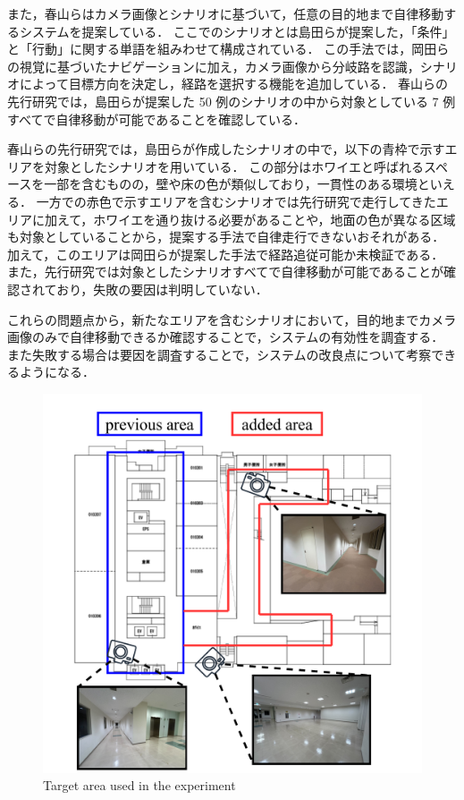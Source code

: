 また，春山らはカメラ画像とシナリオに基づいて，任意の目的地まで自律移動するシステムを提案している．
ここでのシナリオとは島田らが提案した，「条件」と「行動」に関する単語を組みわせて構成されている．
この手法では，岡田らの視覚に基づいたナビゲーションに加え，カメラ画像から分岐路を認識，シナリオによって目標方向を決定し，経路を選択する機能を追加している．
春山らの先行研究では，島田らが提案した 50 例のシナリオの中から対象としている 7 例すべてで自律移動が可能であることを確認している．

春山らの先行研究では，島田らが作成したシナリオの中で，以下の青枠で示すエリアを対象としたシナリオを用いている．
この部分はホワイエと呼ばれるスペースを一部を含むものの，壁や床の色が類似しており，一貫性のある環境といえる．
一方での赤色で示すエリアを含むシナリオでは先行研究で走行してきたエリアに加えて，ホワイエを通り抜ける必要があることや，地面の色が異なる区域も対象としていることから，提案する手法で自律走行できないおそれがある．
加えて，このエリアは岡田らが提案した手法で経路追従可能か未検証である．
また，先行研究では対象としたシナリオすべてで自律移動が可能であることが確認されており，失敗の要因は判明していない．

これらの問題点から，新たなエリアを含むシナリオにおいて，目的地までカメラ画像のみで自律移動できるか確認することで，システムの有効性を調査する．
また失敗する場合は要因を調査することで，システムの改良点について考察できるようになる．

\begin{figure}[htbp]
     \centering
     \includegraphics[width=130mm]{images/pdf/ishiguro/cit3f.pdf}
     \caption{Target area used in the experiment}
     \label{fig:cit3f}
\end{figure}

\newpage
